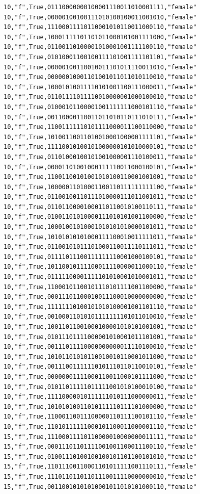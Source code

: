 \documentclass[authoryearcitations]{UoYCSproject}
\begin{document}
\begin{framed}
\begin{verbatim}
10,"f",True,01110000000100001110011010001111,"female"
10,"f",True,00000100100111010100100011001010,"female"
10,"f",True,11100011110110001010110011000110,"female"
10,"f",True,10001111101101011000101001111000,"female"
10,"f",True,01100110100001010001001111100110,"female"
10,"f",True,01010001100100111101001111101101,"female"
10,"f",True,00000100110010011101011110011010,"female"
10,"f",True,00000010001101001011011010110010,"female"
10,"f",True,10001010011110101001100111000011,"female"
10,"f",True,01101111011110010000001000100010,"female"
10,"f",True,01000101100001001111111000101110,"female"
10,"f",True,00110000110011011010110111010111,"female"
10,"f",True,11001111110101111000011100110000,"female"
10,"f",True,10100110011010010001000001111101,"female"
10,"f",True,11110010100101000000101010000101,"female"
10,"f",True,01101000100101001000001110100011,"female"
10,"f",True,00001101001000111110011000100101,"female"
10,"f",True,11001100101001010100110001001001,"female"
10,"f",True,10000011010001100110111111111100,"female"
10,"f",True,01100100110111010000111011001011,"female"
10,"f",True,01101100001000110110010100110111,"female"
10,"f",True,01001101010000111010101001100000,"female"
10,"f",True,10001001010001010101010000101011,"female"
10,"f",True,10101010101000111100010011111011,"female"
10,"f",True,01100101011101000110011110111011,"female"
10,"f",True,01111011100111111110001000100101,"female"
10,"f",True,10110010111100011110000011000110,"female"
10,"f",True,01111100001111101010001010001011,"female"
10,"f",True,11000101100101110101111001100000,"female"
10,"f",True,00011101100010011100010000000000,"female"
10,"f",True,11111110100101010100001001101110,"female"
10,"f",True,00100011010101111111101011010010,"female"
10,"f",True,10011011001000100001010101001001,"female"
10,"f",True,01011101111000001010001011101001,"female"
10,"f",True,00111011110000000000011110100010,"female"
10,"f",True,10101101010110010010110001011000,"female"
10,"f",True,00111001111110101110110110010101,"female"
10,"f",True,00000001111000110011000101111000,"female"
10,"f",True,01011011111011111001010100010100,"female"
10,"f",True,11110000010111111010111000000011,"female"
10,"f",True,10101010011010111110111101000000,"female"
10,"f",True,11000110011100000110111100101110,"female"
10,"f",True,11010111111000101100011000001110,"female"
15,"f",True,11100011110110000010000000011111,"female"
15,"f",True,00011101101111001001100011100110,"female"
15,"f",True,01001110100100100101101100101010,"female"
15,"f",True,11011100110001101011111001110111,"female"
15,"f",True,11101101101101110011110000000010,"female"
15,"f",True,00110010101010001011010101000110,"female"

\end{verbatim}
\end{framed}
\end{document}
